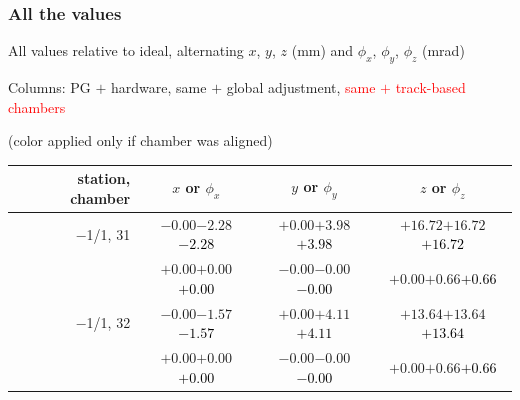 \documentclass[compress]{beamer}
\begin{document}
\begin{frame}
\frametitle{All the values}
\tiny

All values relative to ideal, alternating $x$, $y$, $z$ (mm) and $\phi_x$, $\phi_y$, $\phi_z$ (mrad)

Columns: PG $+$ hardware, same $+$ global adjustment, \textcolor{red}{same $+$ track-based chambers}

\hfill (color applied only if chamber was aligned)

\vfill
\renewcommand{\arraystretch}{1.1}
\begin{tabular}{r | c | c | c}
station, chamber & $x$ or $\phi_x$ & $y$ or $\phi_y$ & $z$ or $\phi_z$ \\\hline
$-$1/1, 31 & $-0.00$\hspace{0.1 cm}$-2.28$\hspace{0.1 cm}\textcolor{black}{$-2.28$} & $+0.00$\hspace{0.1 cm}$+3.98$\hspace{0.1 cm}\textcolor{black}{$+3.98$} & $+16.72$\hspace{0.1 cm}$+16.72$\hspace{0.1 cm}\textcolor{black}{$+16.72$} \\
           & $+0.00$\hspace{0.1 cm}$+0.00$\hspace{0.1 cm}\textcolor{black}{$+0.00$} & $-0.00$\hspace{0.1 cm}$-0.00$\hspace{0.1 cm}\textcolor{black}{$-0.00$} & $+0.00$\hspace{0.1 cm}$+0.66$\hspace{0.1 cm}\textcolor{black}{$+0.66$} \\
$-$1/1, 32 & $-0.00$\hspace{0.1 cm}$-1.57$\hspace{0.1 cm}\textcolor{black}{$-1.57$} & $+0.00$\hspace{0.1 cm}$+4.11$\hspace{0.1 cm}\textcolor{black}{$+4.11$} & $+13.64$\hspace{0.1 cm}$+13.64$\hspace{0.1 cm}\textcolor{black}{$+13.64$} \\
           & $+0.00$\hspace{0.1 cm}$+0.00$\hspace{0.1 cm}\textcolor{black}{$+0.00$} & $-0.00$\hspace{0.1 cm}$-0.00$\hspace{0.1 cm}\textcolor{black}{$-0.00$} & $+0.00$\hspace{0.1 cm}$+0.66$\hspace{0.1 cm}\textcolor{black}{$+0.66$} \\

\end{tabular}
\end{frame}
\end{document}
